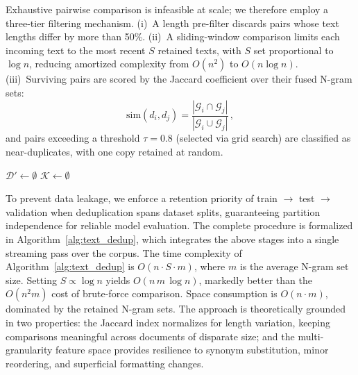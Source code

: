 \documentclass[conference]{IEEEtran}
\begin{document}
Exhaustive pairwise comparison is infeasible at scale; we therefore employ a three-tier filtering mechanism. (i)~A length pre-filter discards pairs whose text lengths differ by more than 50\%. (ii)~A sliding-window comparison limits each incoming text to the most recent $S$ retained texts, with $S$ set proportional to $\log n$, reducing amortized complexity from $O(n^2)$ to $O(n \log n)$. (iii)~Surviving pairs are scored by the Jaccard coefficient over their fused N-gram sets:
\begin{equation}\label{eq:jaccard_text}
    \mathrm{sim}(d_i, d_j) = \frac{|\mathcal{G}_i \cap \mathcal{G}_j|}{|\mathcal{G}_i \cup \mathcal{G}_j|}\,,
\end{equation}
and pairs exceeding a threshold $\tau = 0.8$ (selected via grid search) are classified as near-duplicates, with one copy retained at random.


\begin{algorithm}[t]
\caption{Multi-Granularity N-gram Text Deduplication}
\label{alg:text_dedup}

$\mathcal{D}' \leftarrow \emptyset$\;
$\mathcal{K} \leftarrow \emptyset$ 


\end{algorithm}


To prevent data leakage, we enforce a retention priority of train $\rightarrow$ test $\rightarrow$ validation when deduplication spans dataset splits, guaranteeing partition independence for reliable model evaluation. The complete procedure is formalized in Algorithm~\ref{alg:text_dedup}, which integrates the above stages into a single streaming pass over the corpus. The time complexity of Algorithm~\ref{alg:text_dedup} is $O(n \cdot S \cdot m)$, where $m$ is the average N-gram set size. Setting $S \propto \log n$ yields $O(n\,m\,\log n)$, markedly better than the $O(n^2 m)$ cost of brute-force comparison. Space consumption is $O(n \cdot m)$, dominated by the retained N-gram sets. The approach is theoretically grounded in two properties: the Jaccard index normalizes for length variation, keeping comparisons meaningful across documents of disparate size; and the multi-granularity feature space provides resilience to synonym substitution, minor reordering, and superficial formatting changes.
\end{document}
